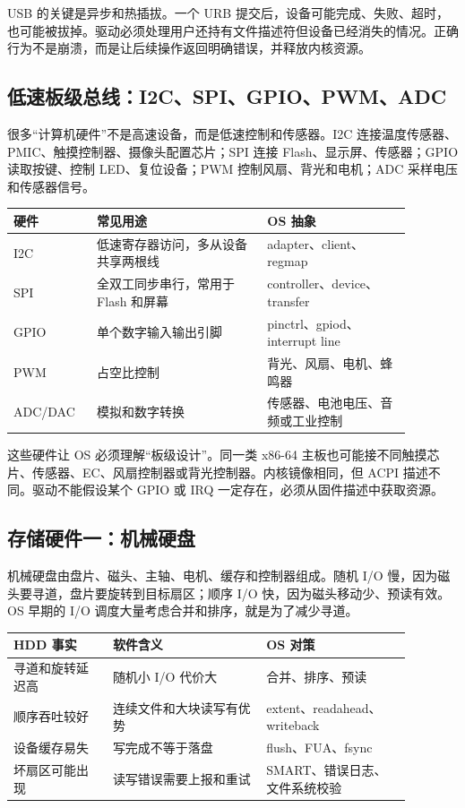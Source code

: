 USB 的关键是异步和热插拔。一个 URB 提交后，设备可能完成、失败、超时，也可能被拔掉。驱动必须处理用户还持有文件描述符但设备已经消失的情况。正确行为不是崩溃，而是让后续操作返回明确错误，并释放内核资源。

\subsection{低速板级总线：I2C、SPI、GPIO、PWM、ADC}

很多“计算机硬件”不是高速设备，而是低速控制和传感器。I2C 连接温度传感器、PMIC、触摸控制器、摄像头配置芯片；SPI 连接 Flash、显示屏、传感器；GPIO 读取按键、控制 LED、复位设备；PWM 控制风扇、背光和电机；ADC 采样电压和传感器信号。

\begin{longtable}{p{0.18\linewidth}p{0.38\linewidth}p{0.32\linewidth}}
\toprule
硬件 & 常见用途 & OS 抽象 \\
\midrule
I2C & 低速寄存器访问，多从设备共享两根线 & adapter、client、regmap \\
SPI & 全双工同步串行，常用于 Flash 和屏幕 & controller、device、transfer \\
GPIO & 单个数字输入输出引脚 & pinctrl、gpiod、interrupt line \\
PWM & 占空比控制 & 背光、风扇、电机、蜂鸣器 \\
ADC/DAC & 模拟和数字转换 & 传感器、电池电压、音频或工业控制 \\
\bottomrule
\end{longtable}

这些硬件让 OS 必须理解“板级设计”。同一类 x86-64 主板也可能接不同触摸芯片、传感器、EC、风扇控制器或背光控制器。内核镜像相同，但 ACPI 描述不同。驱动不能假设某个 GPIO 或 IRQ 一定存在，必须从固件描述中获取资源。

\subsection{存储硬件一：机械硬盘}

机械硬盘由盘片、磁头、主轴、电机、缓存和控制器组成。随机 I/O 慢，因为磁头要寻道，盘片要旋转到目标扇区；顺序 I/O 快，因为磁头移动少、预读有效。OS 早期的 I/O 调度大量考虑合并和排序，就是为了减少寻道。

\begin{longtable}{p{0.22\linewidth}p{0.34\linewidth}p{0.32\linewidth}}
\toprule
HDD 事实 & 软件含义 & OS 对策 \\
\midrule
寻道和旋转延迟高 & 随机小 I/O 代价大 & 合并、排序、预读 \\
顺序吞吐较好 & 连续文件和大块读写有优势 & extent、readahead、writeback \\
设备缓存易失 & 写完成不等于落盘 & flush、FUA、fsync \\
坏扇区可能出现 & 读写错误需要上报和重试 & SMART、错误日志、文件系统校验 \\
\bottomrule
\end{longtable}

